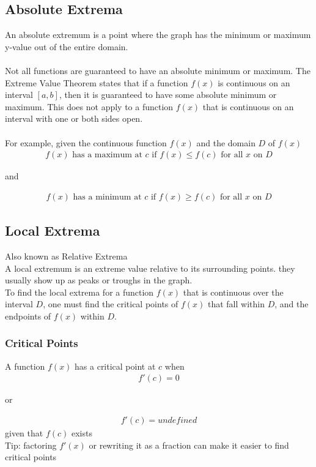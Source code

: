 \documentclass{article}
\begin{document}
    \subsection{Absolute Extrema}
        An absolute extremum is a point where the graph has the minimum or maximum y-value out of the entire domain.\\
        \\
        Not all functions are guaranteed to have an absolute minimum or maximum. The Extreme Value Theorem states that if a function \(f(x)\) is continuous on an interval \([a, b]\), then it is guaranteed to have some absolute minimum or maximum. This does not apply to a function \(f(x)\) that is continuous on an interval with one or both sides open.\\
        \\
        For example, given the continuous function \(f(x)\) and the domain \(D\) of \(f(x)\)
        \begin{gather*}
            f(x) \text{ has a maximum at } c \text{ if } f(x) \leq f(c) \text{ for all } x \text{ on } D
        \end{gather*}
        \centerline{and} 
        \begin{gather*}
            f(x) \text{ has a minimum at } c \text{ if } f(x) \geq f(c) \text{ for all } x \text{ on } D
        \end{gather*}
    \subsection{Local Extrema}
        Also known as Relative Extrema\\
        A local extremum is an extreme value relative to its surrounding points. they usually show up as peaks or troughs in the graph.\\
        To find the local extrema for a function \(f(x)\) that is continuous over the interval \(D\), one must find the critical points of \(f(x)\) that fall within \(D\), and the endpoints of \(f(x)\) within \(D\).
        \subsubsection{Critical Points}
            A function \(f(x)\) has a critical point at \(c\) when 
            \begin{gather*}
                f'(c) = 0
            \end{gather*}
            \centerline{or}
            \begin{gather*}
                f'(c) = undefined
            \end{gather*}
            given that \(f(c)\) exists\\
            Tip: factoring \(f'(x)\) or rewriting it as a fraction can make it easier to find critical points
\end{document}
